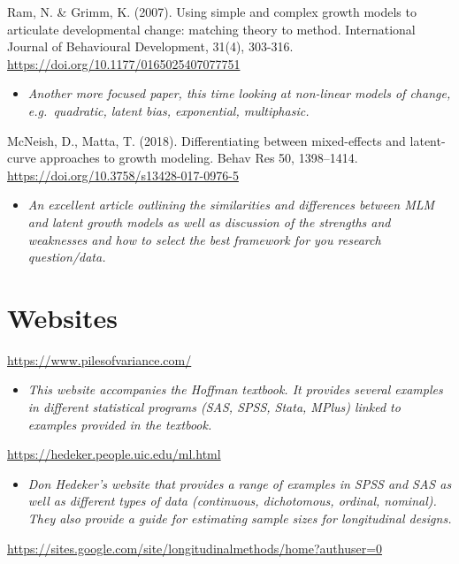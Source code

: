 \documentclass[
]{book}
\providecommand{\tightlist}{%
  \setlength{\itemsep}{0pt}\setlength{\parskip}{0pt}}
\begin{document}
Ram, N. \& Grimm, K. (2007). Using simple and complex growth models to articulate developmental change: matching theory to method. International Journal of Behavioural Development, 31(4), 303-316. \url{https://doi.org/10.1177/0165025407077751}

\begin{itemize}
\tightlist
\item
  \emph{Another more focused paper, this time looking at non-linear models of change, e.g.~quadratic, latent bias, exponential, multiphasic. }
\end{itemize}

McNeish, D., Matta, T. (2018). Differentiating between mixed-effects and latent-curve approaches to growth modeling. Behav Res 50, 1398--1414. \url{https://doi.org/10.3758/s13428-017-0976-5}

\begin{itemize}
\tightlist
\item
  \emph{An excellent article outlining the similarities and differences between MLM and latent growth models as well as discussion of the strengths and weaknesses and how to select the best framework for you research question/data. }
\end{itemize}

\section{Websites}\label{websites-2}

\url{https://www.pilesofvariance.com/}

\begin{itemize}
\tightlist
\item
  \emph{This website accompanies the Hoffman textbook. It provides several examples in different statistical programs (SAS, SPSS, Stata, MPlus) linked to examples provided in the textbook. }
\end{itemize}

\url{https://hedeker.people.uic.edu/ml.html}

\begin{itemize}
\tightlist
\item
  \emph{Don Hedeker's website that provides a range of examples in SPSS and SAS as well as different types of data (continuous, dichotomous, ordinal, nominal). They also provide a guide for estimating sample sizes for longitudinal designs. }
\end{itemize}

\url{https://sites.google.com/site/longitudinalmethods/home?authuser=0}
\end{document}

